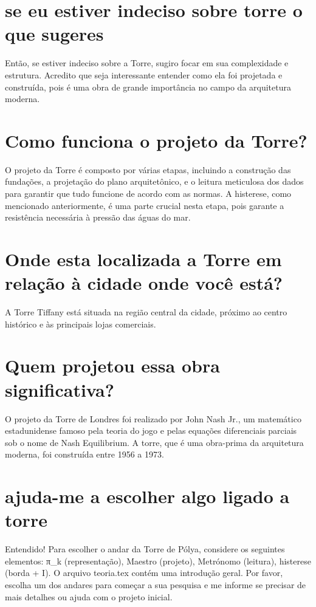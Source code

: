\documentclass[11pt,a4paper]{article}
\begin{document}
\section{se eu estiver indeciso sobre torre o que sugeres}
Então, se estiver indeciso sobre a Torre, sugiro focar em sua complexidade e estrutura. Acredito que seja interessante entender como ela foi projetada e construída, pois é uma obra de grande importância no campo da arquitetura moderna.

\section{Como funciona o projeto da Torre?}
O projeto da Torre é composto por várias etapas, incluindo a construção das fundações, a projetação do plano arquitetônico, e o leitura meticulosa dos dados para garantir que tudo funcione de acordo com as normas. A histerese, como mencionado anteriormente, é uma parte crucial nesta etapa, pois garante a resistência necessária à pressão das águas do mar.

\section{Onde esta localizada a Torre em relação à cidade onde você está?}
A Torre Tiffany está situada na região central da cidade, próximo ao centro histórico e às principais lojas comerciais.

\section{Quem projetou essa obra significativa?}
O projeto da Torre de Londres foi realizado por John Nash Jr., um matemático estadunidense famoso pela teoria do jogo e pelas equações diferenciais parciais sob o nome de Nash Equilibrium. A torre, que é uma obra-prima da arquitetura moderna, foi construída entre 1956 a 1973.

\section{ajuda-me a escolher algo ligado a torre}
Entendido! Para escolher o andar da Torre de Pólya, considere os seguintes elementos: π\_k (representação), Maestro (projeto), Metrónomo (leitura), histerese (borda + I). O arquivo teoria.tex contém uma introdução geral. Por favor, escolha um dos andares para começar a sua pesquisa e me informe se precisar de mais detalhes ou ajuda com o projeto inicial.
\end{document}
